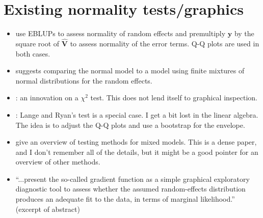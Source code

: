 \documentclass[11pt]{article} %
\begin{document}
\section{Existing normality tests/graphics}

\begin{itemize}

\item \cite{calvin1991} use EBLUPs to assess normality of random effects and premultiply $\bm{y}$ by the square root of $\widehat{\bm{V}}$ to assess normality of the error terms. Q-Q plots are used in both cases.

\item \cite{Verbeke:1996va} suggests comparing the normal model to a model using finite mixtures of normal distributions for the random effects.

\item \cite{Jiang:2001up}: an innovation on a $\chi^2$ test. This does not lend itself to graphical inspection.

\item \cite{houseman2006}: Lange and Ryan's test is a special case. I get a bit lost in the linear algebra. The idea is to adjust the Q-Q plots and use a bootstrap for the envelope.

\item \cite{claeskens2009} give an overview of testing methods for mixed models. This is a dense paper, and I don't remember all of the details, but it might be a good pointer for an overview of other methods.

\item \citep{Verbeke:2013hp} ``...present the so-called gradient function as a simple graphical exploratory diagnostic tool to assess whether the assumed random-effects distribution produces an adequate fit to the data, in terms of marginal likelihood.'' (excerpt of abstract)

\end{itemize}



\end{document}
